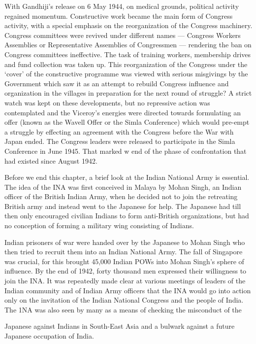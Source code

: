 With Gandhiji's release on 6 May 1944, on medical grounds, political activity regained momentum. Constructive work became the main form of Congress activity, with a special emphasis on the reorganization of the Congress machinery. Congress committees were revived under different names --- Congress Workers Assemblies or Representative Assemblies of Congressmen --- rendering the ban on Congress committees ineffective. The task of training workers, membership drives and fund collection was taken up. This reorganization of the Congress under the `cover' of the constructive programme was viewed with serious misgivings by the Government which saw it as an attempt to rebuild Congress influence and organization in the villages in preparation for the next round of struggle? A strict watch was kept on these developments, but no repressive action was contemplated and the Viceroy's energies were directed towards formulating an offer (known as the Wavell Offer or the Simla Conference) which would pre-empt a struggle by effecting an agreement with the Congress before the War with Japan ended. The Congress leaders were released to participate in the Simla Conference in June 1945. That marked w end of the phase of confrontation that had existed since August 1942.

Before we end this chapter, a brief look at the Indian National Army is essential. The idea of the INA was first conceived in Malaya by Mohan Singh, an Indian officer of the British Indian Army, when he decided not to join the retreating British army and instead went to the Japanese for help. The Japanese had till then only encouraged civilian Indians to form anti-British organizations, but had no conception of forming a military wing consisting of Indians.

Indian prisoners of war were handed over by the Japanese to Mohan Singh who then tried to recruit them into an Indian National Army. The fall of Singapore was crucial, for this brought 45,000 Indian POWs into Mohan Singh's sphere of influence. By the end of 1942, forty thousand men expressed their willingness to join the INA. It was repeatedly made clear at various meetings of leaders of the Indian community and of Indian Army officers that the INA would go into action only on the invitation of the Indian National Congress and the people of India. The 1NA was also seen by many as a means of checking the misconduct of the

Japanese against Indians in South-East Asia and a bulwark against a future Japanese occupation of India.

